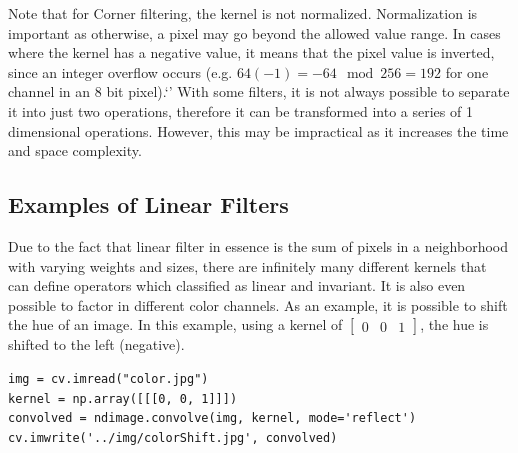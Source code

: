 \documentclass[twoside,a4paper,article]{combine}
\begin{document}
Note that for Corner filtering, the kernel is not normalized. Normalization is important as otherwise, a pixel may go beyond the allowed value range.
In cases where the kernel has a negative value, it means that the pixel value is inverted, since an integer overflow occurs (e.g. $64
(-1)= -64 \mod 256 = 192$ for one channel in an 8 bit pixel).`'
With some filters, it is not always possible to separate it into just two operations, therefore it can be
transformed into a series of 1 dimensional operations. However, this may be impractical as it increases the time and space
complexity.

\subsection{Examples of Linear Filters}
Due to the fact that linear filter in essence is the sum of pixels in a neighborhood with varying weights and sizes, there are infinitely many different kernels that can
define operators which classified as linear and invariant. It is also even possible to factor in different color channels. As an example, it is possible to shift the hue of an image.
In this example, using a kernel of $\begin{bmatrix}0 & 0 & 1\end{bmatrix}$, the hue is shifted to the left (negative).
\lstset{language=Python}
\begin{lstlisting}
img = cv.imread("color.jpg")
kernel = np.array([[[0, 0, 1]]])
convolved = ndimage.convolve(img, kernel, mode='reflect')
cv.imwrite('../img/colorShift.jpg', convolved)
\end{lstlisting}
\end{document}
